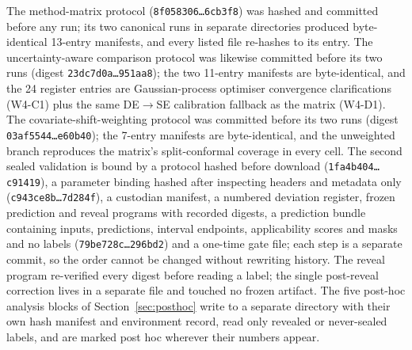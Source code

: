 \documentclass[11pt,a4paper]{article}
\newcommand{\hashtrunc}[2]{\texttt{#1\ldots#2}}
\begin{document}
The method-matrix protocol (\hashtrunc{8f058306}{6cb3f8}) was hashed and
committed before any run; its two canonical runs in separate directories
produced byte-identical 13-entry manifests, and every listed file re-hashes
to its entry. The uncertainty-aware comparison protocol was likewise
committed before its two runs (digest \hashtrunc{23dc7d0a}{951aa8}); the
two 11-entry manifests are byte-identical, and the 24 register entries are Gaussian-process optimiser convergence clarifications (W4-C1) plus the same DE$\to$SE calibration fallback as the matrix (W4-D1). The covariate-shift-weighting protocol
was committed before its two runs (digest \hashtrunc{03af5544}{e60b40}); the
7-entry manifests are byte-identical, and the unweighted branch reproduces the
matrix's split-conformal coverage in every cell. The second sealed validation is bound by
a protocol hashed before download (\hashtrunc{1fa4b404}{c91419}), a parameter binding hashed
after inspecting headers and metadata only (\hashtrunc{c943ce8b}{7d284f}), a
custodian manifest, a numbered deviation register, frozen prediction and
reveal programs with recorded digests, a prediction bundle containing inputs,
predictions, interval endpoints, applicability scores and masks and no labels
(\hashtrunc{79be728c}{296bd2}) and a one-time gate
file; each step is a separate commit, so the order cannot be changed without
rewriting history. The reveal program re-verified every digest before reading
a label; the single post-reveal correction lives in a separate file and
touched no frozen artifact. The five post-hoc analysis blocks of
Section~\ref{sec:posthoc} write to a separate directory with their own hash
manifest and environment record, read only revealed or never-sealed labels,
and are marked post hoc wherever their numbers appear.
\end{document}

